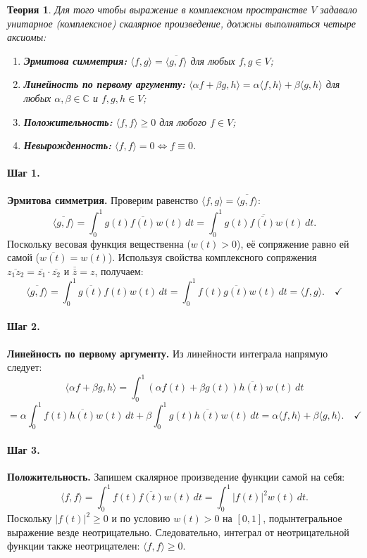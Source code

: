\documentclass[12pt,a4paper]{article}
\theoremstyle{solution}
\newtheorem*{theory}{Теория}
\newcommand{\step}[1]{\paragraph{Шаг #1.}}
\newcommand{\C}{\mathbb{C}}
\begin{document}
\begin{theory}
Для того чтобы выражение в комплексном пространстве $V$ задавало унитарное (комплексное) скалярное произведение, должны выполняться четыре аксиомы:
\begin{enumerate}
    \item \textbf{Эрмитова симметрия:} $\langle f, g\rangle = \overline{\langle g, f\rangle}$ для любых $f, g \in V$;
    \item \textbf{Линейность по первому аргументу:} $\langle \alpha f + \beta g, h\rangle = \alpha \langle f, h\rangle + \beta \langle g, h\rangle$ для любых $\alpha, \beta \in \C$ и $f, g, h \in V$;
    \item \textbf{Положительность:} $\langle f, f\rangle \geq 0$ для любого $f \in V$;
    \item \textbf{Невырожденность:} $\langle f, f\rangle = 0 \iff f \equiv 0$.
\end{enumerate}
\end{theory}

\step{1} \textbf{Эрмитова симметрия.} Проверим равенство $\langle f, g\rangle = \overline{\langle g, f\rangle}$:
\[
\overline{\langle g, f\rangle} = \overline{\int_0^1 g(t)\overline{f(t)}w(t)\,dt} = \int_0^1 \overline{g(t)\overline{f(t)}w(t)}\,dt.
\]
Поскольку весовая функция вещественна ($w(t) > 0$), её сопряжение равно ей самой ($\overline{w(t)} = w(t)$). Используя свойства комплексного сопряжения $\overline{z_1 z_2} = \overline{z_1} \cdot \overline{z_2}$ и $\overline{\overline{z}} = z$, получаем:
\[
\overline{\langle g, f\rangle} = \int_0^1 \overline{g(t)}f(t)w(t)\,dt = \int_0^1 f(t)\overline{g(t)}w(t)\,dt = \langle f, g\rangle. \quad\checkmark
\]

\step{2} \textbf{Линейность по первому аргументу.} Из линейности интеграла напрямую следует:
\[
\langle \alpha f + \beta g, h\rangle = \int_0^1 (\alpha f(t) + \beta g(t))\overline{h(t)}w(t)\,dt 
\]
\[
= \alpha \int_0^1 f(t)\overline{h(t)}w(t)\,dt + \beta \int_0^1 g(t)\overline{h(t)}w(t)\,dt = \alpha \langle f, h\rangle + \beta \langle g, h\rangle. \quad\checkmark
\]

\step{3} \textbf{Положительность.} Запишем скалярное произведение функции самой на себя:
\[
\langle f, f\rangle = \int_0^1 f(t)\overline{f(t)}w(t)\,dt = \int_0^1 |f(t)|^2 w(t)\,dt.
\]
Поскольку $|f(t)|^2 \geq 0$ и по условию $w(t) > 0$ на $[0, 1]$, подынтегральное выражение везде неотрицательно. Следовательно, интеграл от неотрицательной функции также неотрицателен: $\langle f, f\rangle \geq 0$. \quad\checkmark
\end{document}
